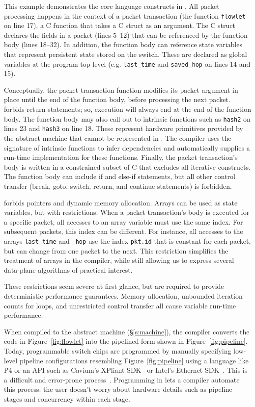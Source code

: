 This example demonstrates the core language constructs in \pktlanguage. All
packet processing happens in the context of a packet transaction (the function
\texttt{flowlet} on line 17), a C function that takes a C struct as an
argument. The C struct declares the fields in a packet (lines 5--12) that can
be referenced by the function body (lines 18--32).  In addition, the function
body can reference state variables that represent persistent state stored on
the switch. These are declared as global variables at the program top level
(e.g. \texttt{last\_time} and \texttt{saved\_hop} on lines 14 and 15).

Conceptually, the packet transaction function modifies its packet argument in
place until the end of the function body, before processing the next packet.
\pktlanguage forbids return statements; so, execution will always end at the
end of the function body. The function body may also call out to intrinsic
functions such as \texttt{hash2} on lines 23 and \texttt{hash3} on line 18.
These represent hardware primitives provided by the abstract machine that
cannot be represented in \pktlanguage. The \pktlanguage compiler uses the
signature of intrinsic functions to infer dependencies and automatically
supplies a run-time implementation for these functions. Finally, the packet
transaction's body is written in a constrained subset of C that excludes all
iterative constructs. The function body can include if and else-if statements,
but all other control transfer (break, goto, switch, return, and continue
statements) is forbidden.

\pktlanguage forbids pointers and dynamic memory allocation. Arrays can be used
as state variables, but with restrictions. When a packet transaction's body is
executed for a specific packet, all accesses to an array variable must use the
same index. For subsequent packets, this index can be different. For instance,
all accesses to the arrays \texttt{last\_time} and \texttt{\saved\_hop} use the
index \texttt{pkt.id} that is constant for each packet, but can change from one
packet to the next. This restriction simplifies the treatment of arrays in the
compiler, while still allowing us to express several data-plane algorithms of
practical interest.

These restrictions seem severe at first glance, but are required to provide
deterministic performance guarantees. Memory allocation, unbounded iteration
counts for loops, and unrestricted control transfer all cause variable run-time
performance.

When compiled to the \absmachine abstract machine (\S\ref{s:machine}), the
\pktlanguage compiler converts the code in Figure~\ref{fig:flowlet} into the
pipelined form shown in Figure~\ref{fig:pipeline}. Today, programmable switch
chips are programmed by manually specifying low-level pipeline configurations
resembling Figure~\ref{fig:pipeline} using a language like P4 or an API such as
Cavium's XPliant SDK~\cite{xpliant_sdk} or Intel's Ethernet
SDK~\cite{intel_sdk}. This is a difficult and error-prone
process~\cite{p4-semantics}.  Programming in \pktlanguage lets a compiler
automate this process: the user doesn't worry about hardware details such as
pipeline stages and concurrency within each stage.
